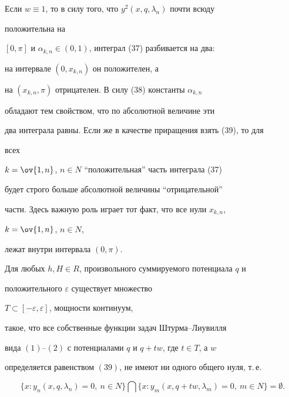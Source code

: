  


\begin{pf} 


Если $w\equiv1$, то в силу того, что $y^2(x,q,\lambda_n)$ почти всюду 


положительна на 


$[0,\pi]$ и $\alpha_{k,n}\in(0,1)$, интеграл (37) разбивается на два: 


на интервале $(0,x_{k,n})$ он положителен, а 


на $(x_{k,n},\pi)$ отрицателен. В силу (38) константы $\alpha_{k,n}$ 


обладают тем свойством, что по абсолютной величине эти 


два интеграла равны. Если же в качестве приращения взять (39), то для 


всех 


$k=\ov{1,n}$, $n\in N$ ``положительная'' часть интеграла (37) 


будет строго больше абсолютной величины ``отрицательной'' 


части. Здесь важную роль играет тот факт, что все нули $x_{k,n}$, 


$k=\ov{1,n}$, $n\in N$, 


лежат внутри интервала $(0,\pi)$. 


\end{pf} 


 


\begin{lem} 


Для любых $h,H\in R$, произвольного суммируемого потенциала $q$ и 


положительного $\varepsilon$ существует множество 


$T\subset[-\varepsilon,\varepsilon]$, мощности континуум, 


такое, что все собственные функции задач Штурма--Лиувилля 


вида $(1)$--$(2)$ с потенциалами $q$ и $q+t{}w$, где $t\in T$, а $w$ 


определяется равенством $(39)$, не имеют ни одного общего нуля, т.\,е. 


$$ 


\{x:y_n(x,q,\lambda_n)=0,\ n\in N\}\bigcap 


\{x:y_m(x,q+t w,\lambda_m)=0,\ m\in N\}=\emptyset. 


$$ 


\end{lem} 


